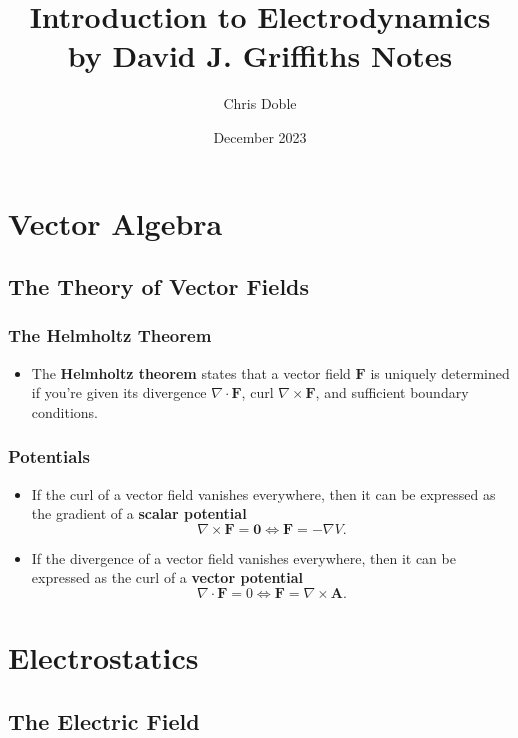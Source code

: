 \documentclass{article}
\title{Introduction to Electrodynamics by David J. Griffiths Notes}
\author{Chris Doble}
\date{December 2023}
\renewcommand{\vec}[1]{\boldsymbol{\mathbf{#1}}}
\begin{document}
\maketitle

\tableofcontents

\section{Vector Algebra}

\setcounter{subsection}{5}
\subsection{The Theory of Vector Fields}

\subsubsection{The Helmholtz Theorem}

\begin{itemize}
  \item The \textbf{Helmholtz theorem} states that a vector field $\vec{F}$ is uniquely determined if you're given its divergence $\nabla \cdot \vec{F}$, curl $\nabla \times \vec{F}$, and sufficient boundary conditions.
\end{itemize}

\subsubsection{Potentials}

\begin{itemize}
  \item If the curl of a vector field vanishes everywhere, then it can be expressed as the gradient of a \textbf{scalar potential} \[\nabla \times \vec{F} = \vec{0} \Leftrightarrow \vec{F} = -\nabla V.\]

  \item If the divergence of a vector field vanishes everywhere, then it can be expressed as the curl of a \textbf{vector potential} \[\nabla \cdot \vec{F} = 0 \Leftrightarrow \vec{F} = \nabla \times \vec{A}.\]
\end{itemize}

\section{Electrostatics}

\subsection{The Electric Field}
\end{document}
